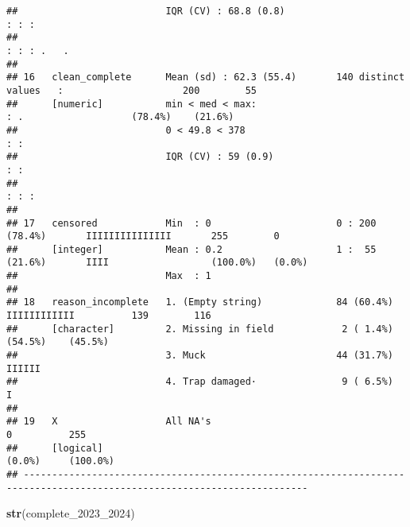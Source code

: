 \documentclass[
]{article}
\newenvironment{Shaded}{\begin{snugshade}}{\end{snugshade}}
\newcommand{\FunctionTok}[1]{\textcolor[rgb]{0.13,0.29,0.53}{\textbf{#1}}}
\newcommand{\NormalTok}[1]{#1}
\begin{document}
\begin{verbatim}
##                          IQR (CV) : 68.8 (0.8)                               : : :                                      
##                                                                              : : : .   .                                
## 
## 16   clean_complete      Mean (sd) : 62.3 (55.4)       140 distinct values   :                     200        55        
##      [numeric]           min < med < max:                                    : .                   (78.4%)    (21.6%)   
##                          0 < 49.8 < 378                                      : :                                        
##                          IQR (CV) : 59 (0.9)                                 : :                                        
##                                                                              : : :                                      
## 
## 17   censored            Min  : 0                      0 : 200 (78.4%)       IIIIIIIIIIIIIII       255        0         
##      [integer]           Mean : 0.2                    1 :  55 (21.6%)       IIII                  (100.0%)   (0.0%)    
##                          Max  : 1                                                                                       
## 
## 18   reason_incomplete   1. (Empty string)             84 (60.4%)            IIIIIIIIIIII          139        116       
##      [character]         2. Missing in field            2 ( 1.4%)                                  (54.5%)    (45.5%)   
##                          3. Muck                       44 (31.7%)            IIIIII                                     
##                          4. Trap damaged·               9 ( 6.5%)            I                                          
## 
## 19   X                   All NA's                                                                  0          255       
##      [logical]                                                                                     (0.0%)     (100.0%)  
## ------------------------------------------------------------------------------------------------------------------------
\end{verbatim}

\begin{Shaded}
\begin{Highlighting}[]
\FunctionTok{str}\NormalTok{(complete\_2023\_2024)}
\end{Highlighting}
\end{Shaded}
\end{document}
